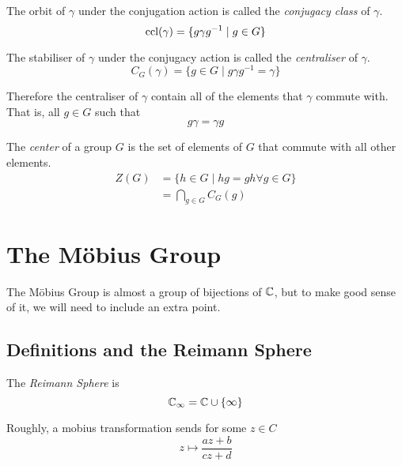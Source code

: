 \documentclass{article}
\begin{document}
\begin{defi}
    The orbit of $\gamma$ under the conjugation action is called the \emph{conjugacy class} of $\gamma$.
    \[
        \operatorname{ccl}(\gamma) = \{g \gamma g^{-1} \mid g \in G\}  
    \]
\end{defi}

\begin{defi}[Centraliser]
    The stabiliser of $\gamma$ under the conjugacy action is called the \emph{centraliser} of $\gamma$.
    \[
        C_G(\gamma) = \{g \in G \mid g \gamma g^{-1} = \gamma\}  
    \]

    Therefore the centraliser of $\gamma$ contain all of the elements that $\gamma$ commute with. That is, all $g \in G$ such that
    \[
        g \gamma = \gamma g  
    \]
\end{defi}

\begin{defi}[Center]
    The \emph{center} of a group $G$ is the set of elements of $G$ that commute with all other elements. 
    \begin{align*}
        Z(G) &= \{h \in G \mid hg = gh \forall g \in G\} \\
        &= \bigcap_{g \in G} C_G(g)
    \end{align*}
\end{defi}

\section{The M\"obius Group}

The M\"obius Group is almost a group of bijections of $\mathbb{C}$, but to make good sense of it, we will need to include an extra point.

\subsection{Definitions and the Reimann Sphere}
\begin{defi}
    The \emph{Reimann Sphere} is
    \[
        \mathbb{C}_\infty = \mathbb{C} \cup \{\infty\}    
    \]
\end{defi}

Roughly, a mobius transformation sends for some $z \in C$
\[
    z \mapsto \frac{az + b}{cz + d}
\]
\end{document}
